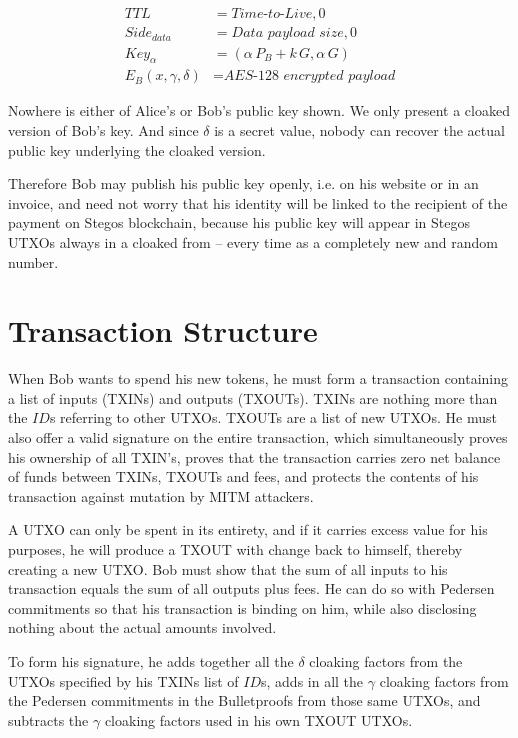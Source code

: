 \documentclass[8pt,fleqn,openany]{book}
\begin{document}
\begin{align*}
TTL &= \textit{Time-to-Live}, 0 \\
Side_{data} &= \textit{Data payload size}, 0 \\
Key_{\alpha} &= (\alpha \, P_{B} + k \, G, \alpha \, G ) \\
E_B(x, \gamma, \delta) &= \textit{AES-128 encrypted payload}
\end{align*}

Nowhere is either of Alice's or Bob's public key shown. We only present a cloaked version of Bob's key. And since $\delta$ is a secret value, nobody can recover the actual public key underlying the cloaked version. 

Therefore Bob may publish his public key openly, i.e. on his website or in an invoice, and need not worry that his identity will be linked to the recipient of the payment on Stegos blockchain, because his public key will appear in Stegos UTXOs always in a cloaked from -- every time as a completely new and random number.

\section{Transaction Structure}

When Bob wants to spend his new tokens, he must form a transaction containing a list of inputs (TXINs) and outputs (TXOUTs). TXINs are nothing more than the $\mathit{ID}$s referring to other UTXOs. TXOUTs are a list of new UTXOs. He must also offer a valid signature on the entire transaction, which simultaneously proves his ownership of all TXIN's, proves that the transaction carries zero net balance of funds between TXINs, TXOUTs and fees, and protects the contents of his transaction against mutation by MITM attackers.

A UTXO can only be spent in its entirety, and if it carries excess value for his purposes, he will produce a TXOUT with change back to himself, thereby creating a new UTXO. Bob must show that the sum of all inputs to his transaction equals the sum of all outputs plus fees. He can do so with Pedersen commitments so that his transaction is binding on him, while also disclosing nothing about the actual amounts involved.

To form his signature, he adds together all the $\delta$ cloaking factors from the UTXOs specified by his TXINs list of $\mathit{ID}$s, adds in all the $\gamma$ cloaking factors from the Pedersen commitments in the Bulletproofs from those same UTXOs, and subtracts the $\gamma$ cloaking factors used in his own TXOUT UTXOs. 
\end{document}
